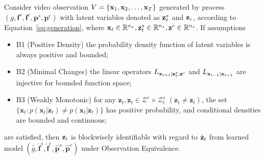 \begin{theorem}
    \label{ap_th: block-wise}
    Consider video observation $V = \{{\mathbf{x}}_1, {\mathbf{x}}_2, \dots, {\mathbf{x}}_T\}$ generated by process $(g, \textbf{f}^s, \textbf{f}^c, \textbf{p}^s, \textbf{p}^c)$ with latent variables denoted as ${\mathbf{z}}_t^s$ and ${\mathbf{z}}_c$, according to Equation~\ref{eq:generation}, where ${\mathbf{x}}_t\in\mathbb{R}^{n_x},{\mathbf{z}}_t^s\in\mathbb{R}^{n_s},{\mathbf{z}}^c\in\mathbb{R}^{n_c}$. If assumptions
    \begin{itemize}
        \item B1 (Positive Density) the probability density function of latent variables is always positive and bounded;
        \item B2 (Minimal Changes) the linear operators $L_{{\mathbf{x}}_{t+1} \mid {\mathbf{z}}_t^s,{\mathbf{z}}^c}$ and $L_{{\mathbf{x}}_{t-1} \mid {\mathbf{x}}_{t+1}}$ are injective for bounded function space; 
        \item B3 (Weakly Monotonic) for any $\dot{\mathbf{z}}_{t}, \ddot{\mathbf{z}}_{t} \in \mathcal{Z}^c\times \mathcal{Z}^s_t$ $(\dot{\mathbf{z}}_{t} \neq  \ddot{\mathbf{z}}_{t})$, the set $\{ \mathbf{x}_t : p (\mathbf{x}_t|\dot{\mathbf{z}}_t) \neq p (\mathbf{x}_t|\ddot{\mathbf{z}}_t) \}$ has positive probability,
        and conditional densities are bounded and continuous;
    \end{itemize}
    are satisfied, then ${\mathbf{z}}_t$ is blockwisely identifiable with regard to $\hat{{\mathbf{z}}}_t$ from learned model $(\hat{g}, \hat{\textbf{f}}^s, \hat{\textbf{f}}^c, \hat{\textbf{p}}^s, \hat{\textbf{p}}^c)$ under Observation Equivalence.
\end{theorem}

